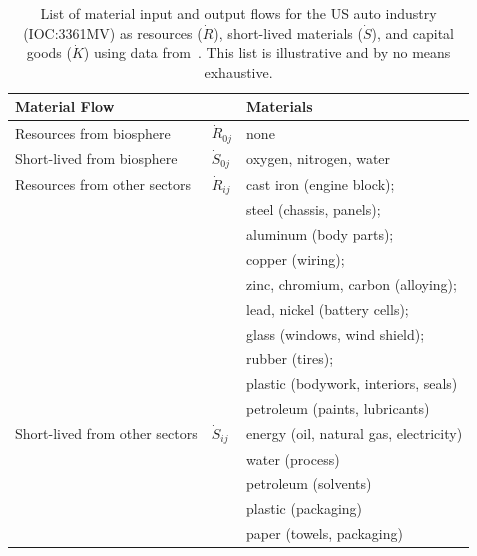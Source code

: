 \begin{table}
\caption[List of material input and output flows for the 
US auto industry]{List of material input and output flows for 
the US auto industry (IOC:3361MV) 
as resources ($\dot{R}$),
short-lived materials ($\dot{S}$),
and capital goods ($\dot{K}$)
using data from~\cite{Sullivan1998, MacLean1998,Schweimer2000,
McCleese2002,MacLean2003, Burnham2006,Sullivan2010, Hawkins2012}.
This list is illustrative and by no means exhaustive.
}
\begin{center}
 \begin{tabular}{p{4cm}p{1cm}p{5.2cm}}
\toprule 
\textbf{Material Flow}		 		& 								& \textbf{Materials} 									\\
\midrule
Resources from biosphere		& $\dot{R}_{0j}$		& none															\\[0.15cm]
Short-lived from biosphere		&	$\dot{S}_{0j}$	& oxygen, nitrogen, water							\\
\midrule
Resources from other sectors	& $\dot{R}_{ij}$		&	 cast iron (engine block);							\\
												&								&	 steel (chassis, panels);							\\
												&								&	 aluminum (body parts); 							\\		
												&								&	 copper (wiring);										\\	
												&								&	 zinc, chromium, carbon (alloying); 			\\
												&								&	 lead, nickel (battery cells);		 				\\
												&								&	 glass (windows, wind shield);					\\
												&								&	 rubber (tires);											\\
												&								&	 plastic (bodywork, interiors, seals)			\\
												&								&	 petroleum (paints, lubricants)					\\[0.15cm]
Short-lived from other sectors	& $\dot{S}_{ij}$		&	 energy (oil, natural gas, electricity)			\\
												&								&	 water (process)										\\
												&								&	 petroleum (solvents)								\\
												&								&	 plastic (packaging)									\\
												&								&	 paper (towels, packaging)						\\[0.15cm]

\end{tabular}
\end{center}
\end{table}

